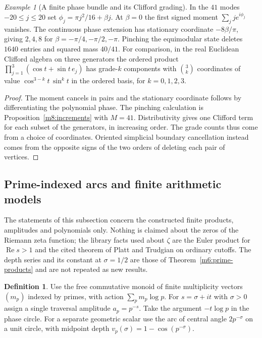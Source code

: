 \documentclass[11pt,reqno]{amsart}
\theoremstyle{definition}
\newtheorem{definition}[theorem]{Definition}
\theoremstyle{remark}
\newtheorem{example}[theorem]{Example}
\numberwithin{equation}{section}
\begin{document}
\begin{example}[A finite phase bundle and its Clifford grading]\label{m8:phase-bundle}
In the $41$ modes $-20\le j\le20$ set
$\phi_j=\pi j^2/16+\beta j$. At $\beta=0$ the first signed
moment $\sum_j j e^{i\phi_j}$ vanishes. The continuous phase extension
has stationary coordinate $-8\beta/\pi$, giving $2,4,8$ for
$\beta=-\pi/4,-\pi/2,-\pi$. Pinching the equimodular state deletes
$1640$ entries and squared mass $40/41$. For comparison, in the
real Euclidean Clifford algebra on three generators the ordered
product $\prod_{j=1}^3(\cos t+\sin t\,e_j)$ has grade-$k$ components
with $\binom3k$ coordinates of value $\cos^{3-k}t\,\sin^kt$ in the
ordered basis, for $k=0,1,2,3$.
\end{example}
\begin{proof}
The moment cancels in pairs and the stationary coordinate follows
by differentiating the polynomial phase. The pinching calculation
is Proposition~\ref{m8:increments} with $M=41$. Distributivity
gives one Clifford term for each subset of the generators, in
increasing order. The grade counts thus come from a choice of
coordinates. Oriented simplicial boundary cancellation instead
comes from the opposite signs of the two orders of deleting
each pair of vertices.
\end{proof}

\subsection{Prime-indexed arcs and finite arithmetic models}

The statements of this subsection concern the constructed finite products, amplitudes and polynomials only.  Nothing is claimed about
the zeros of the Riemann zeta function; the library facts used about $\zeta$ are the Euler product for $\operatorname{Re}s>1$ and the
cited theorem of Platt and Trudgian on ordinary cutoffs.  The depth series and its constant at $\sigma=1/2$ are those of
Theorem~\ref{m6:prime-products} and are not repeated as new results.

\begin{definition}\label{m8:prime-arcs}
Use the free commutative monoid of finite multiplicity vectors
$(m_p)$ indexed by primes, with action $\sum_p m_p\log p$. For
$s=\sigma+it$ with $\sigma>0$ assign a single traversal amplitude
$a_p=p^{-s}$. Take the argument $-t\log p$ in the phase circle.
For a separate geometric scalar use the arc of central angle
$2p^{-\sigma}$ on a unit circle, with midpoint depth
$v_p(\sigma)=1-\cos(p^{-\sigma})$.
\end{definition}
\end{document}
